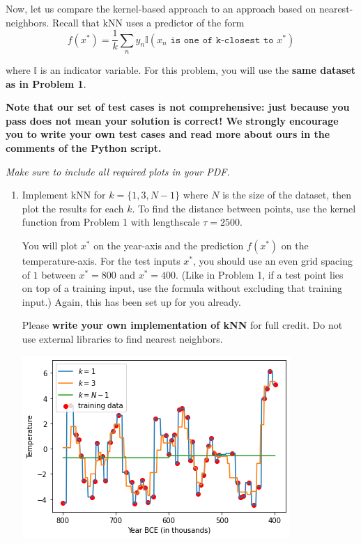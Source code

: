 \documentclass[submit]{harvardml}
\begin{document}

\begin{problem}

Now, let us compare the kernel-based approach to an approach based on
nearest-neighbors.  Recall that kNN uses a predictor of the form
  \begin{equation*}
    f(x^*) = \frac{1}{k} \sum_n y_n \mathbb{I}(x_n \texttt{ is one of k-closest to } x^*)
  \end{equation*}

\noindent where $\mathbb{I}$ is an indicator variable. For this problem, you will use the \textbf{same dataset as in Problem 1}.



\textbf{Note that our set of test cases is not comprehensive: just because you pass does not mean your solution is correct! We strongly encourage you to write your own test cases and read more about ours in the comments of the Python script.}

\vspace{0.5cm}
\noindent\emph{Make sure to include all required plots in your PDF.}


\begin{enumerate}

\item Implement kNN for $k=\{1, 3, N-1\}$ where $N$ is the size of the dataset, then plot the results for each $k$. To find the distance between points, use the kernel function from Problem 1 with lengthscale $\tau=2500$. 

You will plot $x^*$ on the year-axis and the prediction $f(x^*)$ on the temperature-axis.  For the test inputs $x^*$, you should use an even grid spacing of $1$ between $x^* = 800$ and $x^* = 400$.  (Like in Problem 1, if a test point lies on top of a training input, use the formula without excluding that training input.) Again, this has been set up for you already.

Please \textbf{write your own
    implementation of kNN} for full credit.  Do not use external
  libraries to find nearest neighbors.
  
  \begin{center}
\includegraphics[width=.5\textwidth]{hw1/Knn.png}
\end{center}
  

\end{enumerate}
\end{problem}
\end{document}
